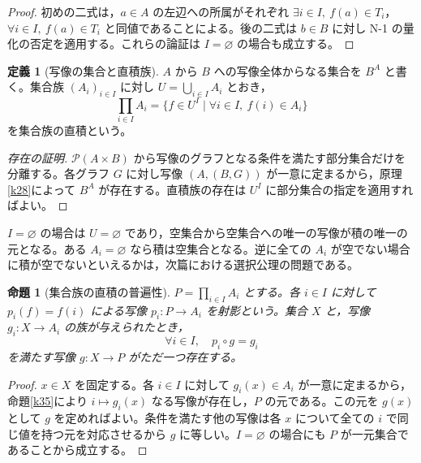 \documentclass[a5paper,10pt,dvipdfmx]{jsarticle}
\theoremstyle{definition}
\newtheorem{defn}[ruledef]{定義}
\theoremstyle{plain}
\newtheorem{prop}[ruledef]{命題}
\newcommand{\Pow}{\mathcal{P}}
\begin{document}
\begin{proof}
初めの二式は，$a\in A$ の左辺への所属がそれぞれ $\exists i\in I,\ f(a)\in T_i$，$\forall i\in I,\ f(a)\in T_i$ と同値であることによる。後の二式は $b\in B$ に対し N-1 の量化の否定を適用する。これらの論証は $I=\varnothing$ の場合も成立する。
\end{proof}
\begin{defn}[写像の集合と直積族]\label{k47}
$A$ から $B$ への写像全体からなる集合を $B^A$ と書く。集合族 $(A_i)_{i\in I}$ に対し $U=\bigcup_{i\in I}A_i$ とおき，
\[
 \prod_{i\in I}A_i=\{f\in U^I\mid\forall i\in I,\ f(i)\in A_i\}
\]
を集合族の直積という。
\end{defn}
\begin{proof}[存在の証明]
$\Pow(A\times B)$ から写像のグラフとなる条件を満たす部分集合だけを分離する。各グラフ $G$ に対し写像 $(A,(B,G))$ が一意に定まるから，原理\ref{k28}によって $B^A$ が存在する。直積族の存在は $U^I$ に部分集合の指定を適用すればよい。
\end{proof}
$I=\varnothing$ の場合は $U=\varnothing$ であり，空集合から空集合への唯一の写像が積の唯一の元となる。ある $A_i=\varnothing$ なら積は空集合となる。逆に全ての $A_i$ が空でない場合に積が空でないといえるかは，次篇における選択公理の問題である。
\begin{prop}[集合族の直積の普遍性]\label{k48}
$P=\prod_{i\in I}A_i$ とする。各 $i\in I$ に対して $p_i(f)=f(i)$ による写像 $p_i:P\to A_i$ を射影という。集合 $X$ と，写像 $g_i:X\to A_i$ の族が与えられたとき，
\[
 \forall i\in I,\quad p_i\circ g=g_i
\]
を満たす写像 $g:X\to P$ がただ一つ存在する。
\end{prop}
\begin{proof}
$x\in X$ を固定する。各 $i\in I$ に対して $g_i(x)\in A_i$ が一意に定まるから，命題\ref{k35}により $i\mapsto g_i(x)$ なる写像が存在し，$P$ の元である。この元を $g(x)$ として $g$ を定めればよい。条件を満たす他の写像は各 $x$ について全ての $i$ で同じ値を持つ元を対応させるから $g$ に等しい。$I=\varnothing$ の場合にも $P$ が一元集合であることから成立する。
\end{proof}
\end{document}
